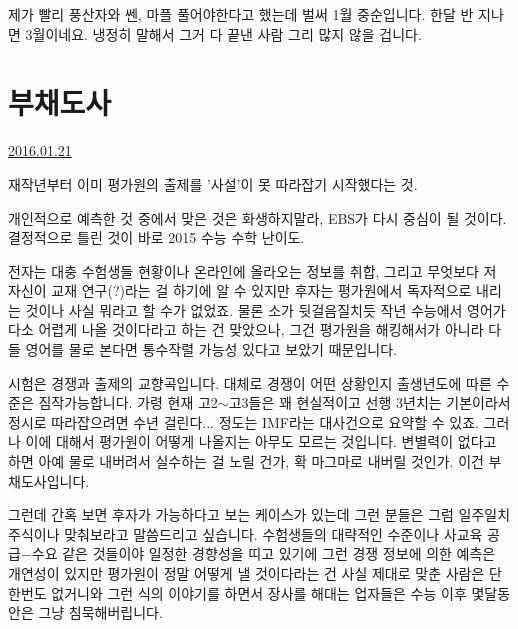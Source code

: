 제가 빨리 풍산자와 쎈, 마플 풀어야한다고 했는데 벌써 1월 중순입니다. 한달 반 지나면 3월이네요.
냉정히 말해서 그거 다 끝낸 사람 그리 많지 않을 겁니다.
\vspace{5mm}








\section{부채도사}
\href{https://www.kockoc.com/Apoc/603292}{2016.01.21}

\vspace{5mm}

재작년부터 이미 평가원의 출제를 '사설'이 못 따라잡기 시작했다는 것.
\vspace{5mm}

개인적으로 예측한 것 중에서 맞은 것은 화생하지말라, EBS가 다시 중심이 될 것이다.
결정적으로 틀린 것이 바로 2015 수능 수학 난이도.
\vspace{5mm}

전자는 대충 수험생들 현황이나 온라인에 올라오는 정보를 취합, 그리고 무엇보다 저 자신이 교재 연구(?)라는 걸 하기에 알 수 있지만
후자는 평가원에서 독자적으로 내리는 것이나 사실 뭐라고 할 수가 없었죠.
물론 소가 뒷걸음질치듯 작년 수능에서 영어가 다소 어렵게 나올 것이다라고 하는 건 맞았으나,
그건 평가원을 해킹해서가 아니라 다들 영어를 물로 본다면 통수작렬 가능성 있다고 보았기 때문입니다.
\vspace{5mm}

시험은 경쟁과 출제의 교향곡입니다.
대체로 경쟁이 어떤 상황인지 출생년도에 따른 수준은 짐작가능합니다.
가령 현재 고2$\sim$고3들은 꽤 현실적이고 선행 3년치는 기본이라서 정시로 따라잡으려면 수년 걸린다... 정도는 IMF라는 대사건으로 요약할 수 있죠.
그러나 이에 대해서 평가원이 어떻게 나올지는 아무도 모르는 것입니다.
변별력이 없다고 하면 아예 물로 내버려서 실수하는 걸 노릴 건가, 확 마그마로 내버릴 것인가. 이건 부채도사입니다.
\vspace{5mm}

그런데 간혹 보면 후자가 가능하다고 보는 케이스가 있는데 그런 분들은 그럼 일주일치 주식이나 맞춰보라고 말씀드리고 싶습니다.
수험생들의 대략적인 수준이나 사교육 공급$-$수요 같은 것들이야 일정한 경향성을 띠고 있기에 그런 경쟁 정보에 의한 예측은 개연성이 있지만
평가원이 정말 어떻게 낼 것이다라는 건 사실 제대로 맞춘 사람은 단 한번도 없거니와
그런 식의 이야기를 하면서 장사를 해대는 업자들은 수능 이후 몇달동안은 그냥 침묵해버립니다.
\vspace{5mm}

